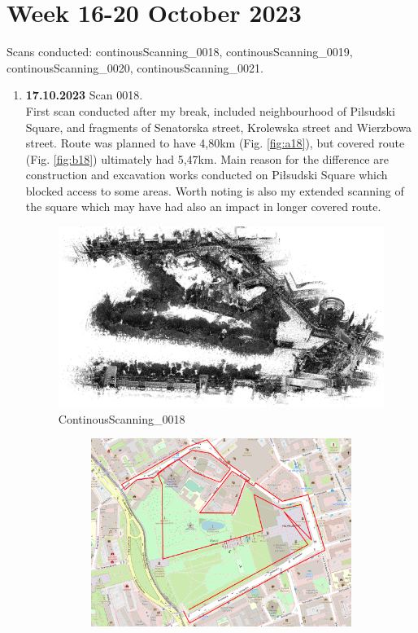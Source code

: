 \documentclass[a4paper,12pt]{book}
\begin{document}
\section{Week 16-20 October 2023}
Scans conducted: continousScanning\_0018, continousScanning\_0019, continousScanning\_0020, continousScanning\_0021.\\
\begin{enumerate}
	\item \textbf{17.10.2023} Scan 0018. \\
	First scan conducted after my break, included neighbourhood of Pilsudski Square, and fragments of Senatorska street, Krolewska street and Wierzbowa street. Route was planned to have 4,80km (Fig. \ref{fig:a18}), but covered route (Fig. \ref{fig:b18}) ultimately had 5,47km. Main reason for the difference are construction and excavation works conducted on Piłsudski Square which blocked access to some areas. Worth noting is also my extended scanning of the square which may have had also an impact in longer covered route.
	\begin{figure}[H]
		\includegraphics[width=1\linewidth]{cloud18}
		\caption{ContinousScanning\_0018}
	\end{figure}
	\begin{figure}[H]
		\centering
		\begin{subfigure}{.95\textwidth}
			\centering
			\includegraphics[width=1\linewidth]{route_p18}

\end{subfigure}
\end{figure}
\end{enumerate}
\end{document}
